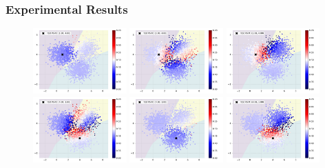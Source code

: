 \begin{frame}
\frametitle{Experimental Results}

    \begin{figure}[ht]
        \centering
        \includegraphics[width=0.32\textwidth]{c4_figures/test_kernel_example_class_00_sample_00.pdf}
        \includegraphics[width=0.32\textwidth]{c4_figures/test_kernel_example_class_01_sample_00.pdf}
        \includegraphics[width=0.32\textwidth]{c4_figures/test_kernel_example_class_02_sample_00.pdf}\\
        
        \includegraphics[width=0.32\textwidth]{c4_figures/test_kernel_example_class_00_sample_01.pdf}
        \includegraphics[width=0.32\textwidth]{c4_figures/test_kernel_example_class_01_sample_01.pdf}
        \includegraphics[width=0.32\textwidth]{c4_figures/test_kernel_example_class_02_sample_01.pdf}\\


\end{figure}
\end{frame}
